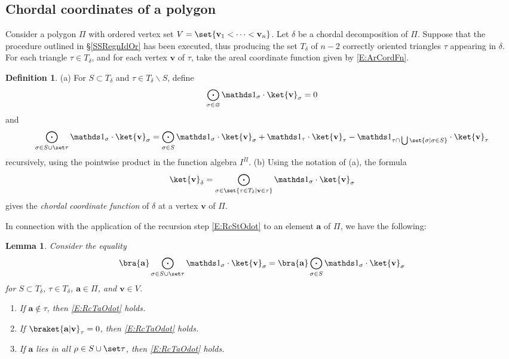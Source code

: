 \documentclass[12pt]{amsart}
\theoremstyle{plain}
\newtheorem{lemma}[theorem]{Lemma}
\theoremstyle{definition}
\newtheorem{definition}[theorem]{Definition}
\numberwithin{equation}{section}
\begin{document}
\subsection{Chordal coordinates of a polygon}\label{SSS:ChordFun}


Consider a polygon $\Pi$ with ordered vertex set $V=\set{\mathbf v_1<\dots<\mathbf v_n}$. Let $\delta$ be a chordal decomposition of $\Pi$. Suppose that the procedure outlined in \S\ref{SSRegnIdOr} has been executed, thus producing the set $T_\delta$ of $n-2$ correctly oriented triangles $\tau$ appearing in $\delta$. For each triangle $\tau\in T_\delta$, and for each vertex $\mathbf v$ of $\tau$, take the areal coordinate function given by \eqref{E:ArCordFn}.




\begin{definition}\label{D:ChordFun}
(a)
For $S\subset T_\delta$ and $\tau\in T_\delta\smallsetminus S$, define
$$
\bigodot_{\sigma\in\varnothing}\mathds 1_\sigma\cdot\ket{\mathbf v}_\sigma=0
$$
and
\begin{equation}\label{E:RcStOdot}
\bigodot_{\sigma\in S\cup\set\tau}\mathds 1_\sigma\cdot\ket{\mathbf v}_\sigma
=\bigodot_{\sigma\in S}\mathds 1_\sigma\cdot\ket{\mathbf v}_\sigma
+\mathds 1_\tau\cdot\ket{\mathbf v}_\tau
-\mathds 1_{\tau\cap\,\bigcup\set{\sigma|\sigma\in S}}\cdot\ket{\mathbf v}_\tau
\end{equation}
recursively, using the pointwise product in the function algebra $I^\Pi$.
\vskip 2mm
\noindent
(b)
Using the notation of (a), the formula
\begin{equation}\label{E:ChordFun}
\ket{\mathbf v}_\delta
=\bigodot_{\sigma\in\set{\tau\in T_\delta|\mathbf v\in\tau}}\mathds 1_\sigma\cdot\ket{\mathbf v}_\sigma
\end{equation}
gives the \emph{chordal coordinate function} of $\delta$ at a vertex $\mathbf v$ of $\Pi$.
\end{definition}


In connection with the application of the recursion step \eqref{E:RcStOdot} to an element $\mathbf a$ of $\Pi$, we have the following:


\begin{lemma}\label{L:RcStOdot}
Consider the equality
\begin{equation}\label{E:RcTaOdot}
\bra{\mathbf a}\bigodot_{\sigma\in S\cup\set\tau}\mathds 1_\sigma\cdot\ket{\mathbf v}_\sigma
=
\bra{\mathbf a}\bigodot_{\sigma\in S}\mathds 1_\sigma\cdot\ket{\mathbf v}_\sigma
\end{equation}
for $S\subset T_\delta$, $\tau\in T_\delta$, $\mathbf a\in\Pi$, and $\mathbf v\in V$.
\begin{enumerate}
\item[$(a)$]
If $\mathbf a\notin\tau$, then \eqref{E:RcTaOdot} holds.
\item[$(b)$]
If $\braket{\mathbf a|\mathbf v}_\tau=0$, then \eqref{E:RcTaOdot} holds.
\item[$(c)$]
If $\mathbf a$ lies in all $\rho\in S\cup\set\tau$, then \eqref{E:RcTaOdot} holds.
\end{enumerate}
\end{lemma}
\end{document}
